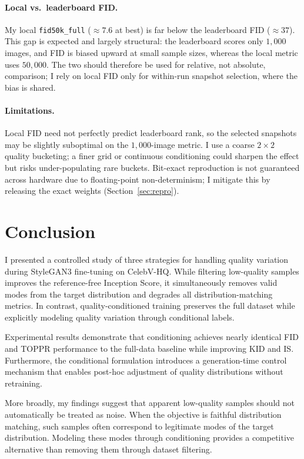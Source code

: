 \documentclass{article}
\begin{document}
\paragraph{Local vs.\ leaderboard FID.}
My local \texttt{fid50k\_full} ($\approx 7.6$ at best) is far below the
leaderboard FID ($\approx 37$). This gap is expected and largely structural: the
leaderboard scores only $1{,}000$ images, and FID is biased upward at small
sample sizes, whereas the local metric uses $50{,}000$. The two should therefore
be used for relative, not absolute, comparison; I rely on local FID only for
within-run snapshot selection, where the bias is shared.

\paragraph{Limitations.}
Local FID need not perfectly predict leaderboard rank, so the selected snapshots
may be slightly suboptimal on the $1{,}000$-image metric. I use a coarse
$2\times2$ quality bucketing; a finer grid or continuous conditioning could
sharpen the effect but risks under-populating rare buckets. Bit-exact
reproduction is not guaranteed across hardware due to floating-point
non-determinism; I mitigate this by releasing the exact weights
(Section~\ref{sec:repro}).

\section{Conclusion}
I presented a controlled study of three strategies for handling quality variation during StyleGAN3 fine-tuning on CelebV-HQ. While filtering low-quality samples improves the reference-free Inception Score, it simultaneously removes valid modes from the target distribution and degrades all distribution-matching metrics. In contrast, quality-conditioned training preserves the full dataset while explicitly modeling quality variation through conditional labels.

Experimental results demonstrate that conditioning achieves nearly identical FID and TOPPR performance to the full-data baseline while improving KID and IS. Furthermore, the conditional formulation introduces a generation-time control mechanism that enables post-hoc adjustment of quality distributions without retraining.

More broadly, my findings suggest that apparent low-quality samples should not automatically be treated as noise. When the objective is faithful distribution matching, such samples often correspond to legitimate modes of the target distribution. Modeling these modes through conditioning provides a competitive alternative than removing them through dataset filtering.
\end{document}
